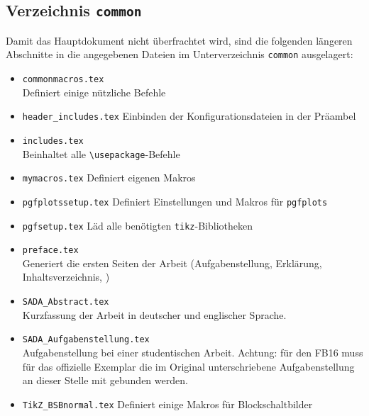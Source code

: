 \subsection{Verzeichnis \texttt{common}}
Damit das Hauptdokument nicht überfrachtet wird, sind die folgenden längeren \glqq{}Abschnitte\grqq{} in die angegebenen Dateien im Unterverzeichnis \verb|common| ausgelagert:
\begin{itemize}
	\item \verb|commonmacros.tex|\\
		Definiert einige nützliche Befehle
	\item \verb|header_includes.tex|
		Einbinden der Konfigurationsdateien in der Präambel
	\item \verb|includes.tex|\\
		Beinhaltet alle \verb|\usepackage|-Befehle
	\item \verb|mymacros.tex|
		Definiert eigenen Makros
	\item \verb|pgfplotssetup.tex|
		Definiert Einstellungen und Makros für \texttt{pgfplots}
	\item \verb|pgfsetup.tex|
		Läd alle benötigten \texttt{tikz}-Bibliotheken
	\item \verb|preface.tex|\\
		Generiert die ersten Seiten der Arbeit (Aufgabenstellung, Erklärung, Inhaltsverzeichnis, \etc)
	\item \verb|SADA_Abstract.tex|\\
		Kurzfassung der Arbeit in deutscher und englischer Sprache.
	\item \verb|SADA_Aufgabenstellung.tex|\\
		Aufgabenstellung bei einer studentischen Arbeit. Achtung: für den FB16 muss für das offizielle Exemplar die im Original unterschriebene Aufgabenstellung an dieser Stelle mit gebunden werden.
	\item \verb|TikZ_BSBnormal.tex|
		Definiert einige Makros für Blockschaltbilder
\end{itemize}


